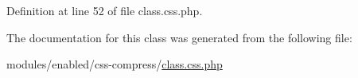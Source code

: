 Definition at line 52 of file class.\-css.\-php.



The documentation for this class was generated from the following file\-:\begin{DoxyCompactItemize}
\item 
modules/enabled/css-\/compress/\hyperlink{class_8css_8php}{class.\-css.\-php}\end{DoxyCompactItemize}
